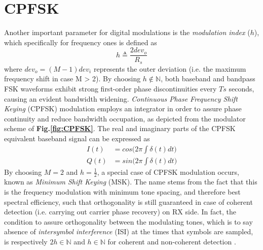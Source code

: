 \documentclass[twoside,twocolumn]{article}
\begin{document}

\section{CPFSK}
Another important parameter for digital modulations is the \textit{modulation index} ($h$), which specifically for frequency ones is defined as
\begin{equation} \label{eq:ModIdx}
h \triangleq \frac{2\mathit{dev_o}}{R_s}
\end{equation}
where $dev_o = (M-1)dev_i$ represents the outer deviation (i.e. the maximum frequency shift in case M > 2).
By choosing $h\! \notin \! \mathbb{N}$, both baseband and bandpass FSK waveforms exhibit strong first-order phase discontinuities every $Ts$ seconds, causing an evident bandwidth widening. \textit{Continuous Phase Frequency Shift Keying} (CPFSK) modulation employs an integrator in order to assure phase continuity and reduce bandwidth occupation, as depicted from the modulator scheme of \textbf{Fig.\ref{fig:CPFSK}}. The real and imaginary parts of the CPFSK equivalent baseband signal can be expressed as
\begin{align}
I(t) &= cos\Big(2\pi \! \int \! \delta(t)dt\Big) \nonumber \\
Q(t) &= sin\Big(2\pi \! \int \! \delta(t)dt\Big) \nonumber
\end{align}
By choosing $M \! = \! 2$ and $h \! = \! \frac{1}{2}$, a special case of CPFSK modulation occurs, known as \textit{Minimum Shift Keying} (MSK). The name stems from the fact that this is the frequency modulation with minimum tone spacing, and therefore best spectral efficiency, such that orthogonality is still guaranteed in case of coherent detection (i.e. carrying out carrier phase recovery) on RX side. In fact, the condition to assure orthogonality between the modulating tones, which is to say absence of \textit{intersymbol interference} (ISI) at the times that symbols are sampled, is respectively $2h\! \in \! \mathbb{N}$ and $h\! \in \! \mathbb{N}$ for coherent and non-coherent detection \textsuperscript{\cite{bib:Sklar}}.
\end{document}
